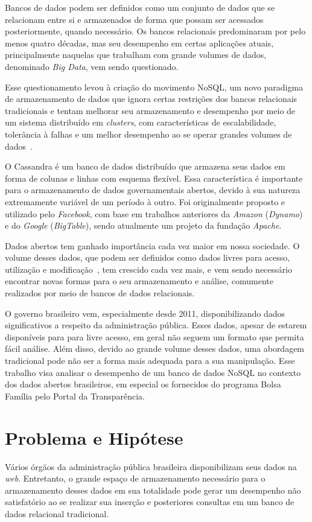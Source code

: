 Bancos de dados podem ser definidos como um conjunto de dados que se relacionam entre si e armazenados de forma que possam ser acessados posteriormente, quando necessário.
Os bancos relacionais predominaram por pelo menos quatro décadas, mas seu desempenho em certas aplicações atuais, principalmente naquelas que trabalham com grande volumes de dados, denominado \emph{Big Data}, vem sendo questionado. 

Esse questionamento levou à criação do movimento NoSQL, um novo paradigma de armazenamento de dados que ignora certas restrições dos bancos relacionais tradicionais e tentam melhorar seu armazenamento e desempenho por meio de um sistema distribuído em \emph{clusters}, com características de escalabilidade, tolerância à falhas e um melhor desempenho ao se operar grandes volumes de dados~\cite{pramod}.

O Cassandra é um banco de dados distribuído que armazena seus dados em forma de colunas e linhas com esquema flexível. Essa característica é importante para o armazenamento de dados governamentais abertos, devido à sua natureza extremamente variável de um período à outro. Foi originalmente proposto e utilizado pelo \emph{Facebook}, com base em trabalhos anteriores da \emph{Amazon} (\emph{Dynamo}) e do \emph{Google} (\emph{BigTable}), sendo atualmente um projeto da fundação \emph{Apache}.

Dados abertos tem ganhado importância cada vez maior em nossa sociedade. O volume desses dados, que podem ser definidos como dados livres para acesso, utilização e modificação~\cite{opendefinition}, tem crescido cada vez mais, e vem sendo necessário encontrar novas formas para o seu armazenamento e análise, comumente realizados por meio de bancos de dados relacionais.

O governo brasileiro vem, especialmente desde 2011, disponibilizando dados significativos a respeito da administração pública. Esses dados, apesar de estarem disponíveis para para livre acesso, em geral não seguem um formato que permita fácil análise. Além disso, devido ao grande volume desses dados, uma abordagem tradicional pode não ser a forma mais adequada para a sua manipulação. Esse trabalho visa analisar o desempenho de um banco de dados NoSQL no contexto dos dados abertos brasileiros, em especial os fornecidos do programa Bolsa Família pelo Portal da Transparência.

\section{Problema e Hipótese}
Vários órgãos da administração pública brasileira disponibilizam seus dados na \emph{web}. Entretanto, o grande espaço de armazenamento necessário para o armazenamento desses dados em sua totalidade pode gerar um desempenho não satisfatório ao se realizar sua inserção e posteriores consultas em um banco de dados relacional tradicional.

